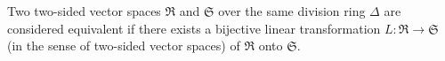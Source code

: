 Two two-sided vector spaces $\mathfrak{R}$ and $\mathfrak{S}$ over the same division ring $\Delta$ are considered equivalent if there exists a bijective linear transformation $L: \mathfrak{R} \to \mathfrak{S}$ (in the sense of two-sided vector spaces) of $\mathfrak{R}$ onto $\mathfrak{S}$.
